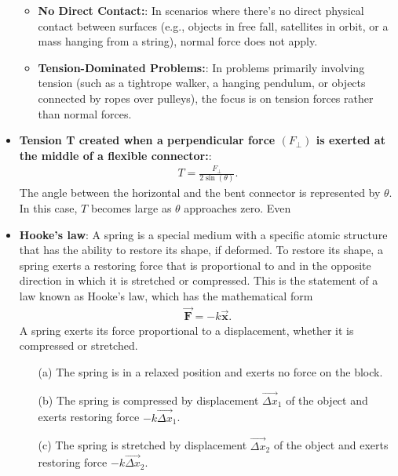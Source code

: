 \documentclass{report}
\begin{document}
\begin{itemize}
\begin{itemize}
                    \item \textbf{No Direct Contact:}: In scenarios where there's no direct physical contact between surfaces (e.g., objects in free fall, satellites in orbit, or a mass hanging from a string), normal force does not apply.
                    \item \textbf{Tension-Dominated Problems:}: In problems primarily involving tension (such as a tightrope walker, a hanging pendulum, or objects connected by ropes over pulleys), the focus is on tension forces rather than normal forces.
                \end{itemize}
        \item \textbf{Tension T created when a perpendicular force  $(F_{\perp})$ is exerted at the middle of a flexible connector:}:
            \begin{align*}
                T=\frac{F_{\perp}}{2\sin{\left(\theta \right)}}
            .\end{align*}
            The angle between the horizontal and the bent connector is represented by $\theta$. In this case, $T$ becomes large as $\theta$ approaches zero. Even
        \item \textbf{Hooke’s law}: A spring is a special medium with a specific atomic structure that has the ability to restore its shape, if deformed. To restore its shape, a spring exerts a restoring force that is proportional to and in the opposite direction in which it is stretched or compressed. This is the statement of a law known as Hooke’s law, which has the mathematical form
            \begin{align*}
                \vec{\mathbf{F}} = -k\vec{\mathbf{x}}
            .\end{align*}
            \bigbreak \noindent 
                A spring exerts its force proportional to a displacement, whether it is compressed or stretched.
            \begin{enumerate}
                \item[(a)] The spring is in a relaxed position and exerts no force on the block.
                \item[(b)] The spring is compressed by displacement $\vec{\Delta x}_1$ of the object and exerts restoring force $-k\vec{\Delta x}_1$.
                \item[(c)] The spring is stretched by displacement $\vec{\Delta x}_2$ of the object and exerts restoring force $-k\vec{\Delta x}_2$.
            \end{enumerate}

\end{itemize}
\end{document}
